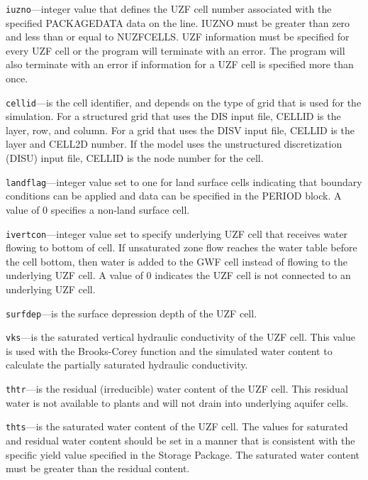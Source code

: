 \begin{description}
\item \texttt{iuzno}---integer value that defines the UZF cell number associated with the specified PACKAGEDATA data on the line. IUZNO must be greater than zero and less than or equal to NUZFCELLS.  UZF information must be specified for every UZF cell or the program will terminate with an error.  The program will also terminate with an error if information for a UZF cell is specified more than once.

\item \texttt{cellid}---is the cell identifier, and depends on the type of grid that is used for the simulation.  For a structured grid that uses the DIS input file, CELLID is the layer, row, and column.   For a grid that uses the DISV input file, CELLID is the layer and CELL2D number.  If the model uses the unstructured discretization (DISU) input file, CELLID is the node number for the cell.

\item \texttt{landflag}---integer value set to one for land surface cells indicating that boundary conditions can be applied and data can be specified in the PERIOD block. A value of 0 specifies a non-land surface cell.

\item \texttt{ivertcon}---integer value set to specify underlying UZF cell that receives water flowing to bottom of cell. If unsaturated zone flow reaches the water table before the cell bottom, then water is added to the GWF cell instead of flowing to the underlying UZF cell. A value of 0 indicates the UZF cell is not connected to an underlying UZF cell.

\item \texttt{surfdep}---is the surface depression depth of the UZF cell.

\item \texttt{vks}---is the saturated vertical hydraulic conductivity of the UZF cell.  This value is used with the Brooks-Corey function and the simulated water content to calculate the partially saturated hydraulic conductivity.

\item \texttt{thtr}---is the residual (irreducible) water content of the UZF cell.  This residual water is not available to plants and will not drain into underlying aquifer cells.

\item \texttt{thts}---is the saturated water content of the UZF cell.  The values for saturated and residual water content should be set in a manner that is consistent with the specific yield value specified in the Storage Package.  The saturated water content must be greater than the residual content.


\end{description}
